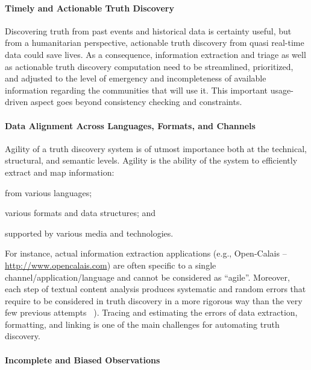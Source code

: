 \documentclass[prodmode,acmtecs]{acmsmall} %
\begin{document}
\paragraph*{Timely and Actionable Truth Discovery} 
Discovering truth from past events and historical data is certainty useful, but
from a humanitarian perspective, actionable truth discovery from quasi real-time data 
could save lives. As a consequence, information extraction and triage as well as actionable
truth discovery computation need to be streamlined, prioritized,  and adjusted to the level 
of emergency and incompleteness of available information regarding the communities that will 
use it. This important usage-driven aspect goes beyond consistency checking and constraints.
%

\paragraph*{Data Alignment Across Languages, Formats, and Channels} 
Agility of a truth discovery system is of utmost importance both at 
the technical, structural, and semantic levels. 
Agility is the ability of the system 
to efficiently extract and map information: 
\begin{inparaenum}[(i)]
\item from various languages;
\item various formats and data structures; and
\item supported by various media and technologies.
\end{inparaenum}
For instance, actual information extraction applications (e.g., Open-Calais -- \url{http://www.opencalais.com})  
are often specific to a single channel/application/language and cannot be considered as ``agile''. Moreover,
each step of textual content analysis produces systematic and random errors that 
require to be considered in truth discovery in a more rigorous way than the very few previous attempts
~\cite{GoasdoueKKLMZ13}). Tracing and estimating  the errors of data extraction, formatting, and linking
is one of the main challenges for automating truth discovery. 
%

\paragraph*{Incomplete and Biased Observations}  
\end{document}
